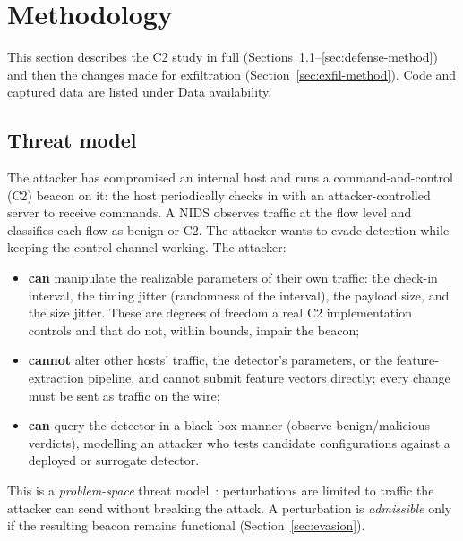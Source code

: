 \documentclass[preprint,12pt]{elsarticle}
\begin{document}
\section{Methodology}
\label{sec:method}

This section describes the C2 study in full (Sections~\ref{sec:threat}--\ref{sec:defense-method}) and
then the changes made for exfiltration (Section~\ref{sec:exfil-method}). Code and captured data are
listed under Data availability.

\subsection{Threat model}
\label{sec:threat}
The attacker has compromised an internal host and runs a command-and-control (C2) beacon on it: the
host periodically checks in with an attacker-controlled server to receive commands. A NIDS observes
traffic at the flow level and classifies each flow as benign or C2. The attacker wants to evade
detection while keeping the control channel working. The attacker:
\begin{itemize}
  \item \textbf{can} manipulate the realizable parameters of their own traffic: the check-in interval,
        the timing jitter (randomness of the interval), the payload size, and the size jitter. These
        are degrees of freedom a real C2 implementation controls and that do not, within bounds,
        impair the beacon;
  \item \textbf{cannot} alter other hosts' traffic, the detector's parameters, or the
        feature-extraction pipeline, and cannot submit feature vectors directly; every change must be
        sent as traffic on the wire;
  \item \textbf{can} query the detector in a black-box manner (observe benign/malicious verdicts),
        modelling an attacker who tests candidate configurations against a deployed or surrogate
        detector.
\end{itemize}
This is a \emph{problem-space} threat model~\cite{pierazzi2020}: perturbations are limited to traffic the
attacker can send without breaking the attack. A perturbation is \emph{admissible} only if the
resulting beacon remains functional (Section~\ref{sec:evasion}).
\end{document}
